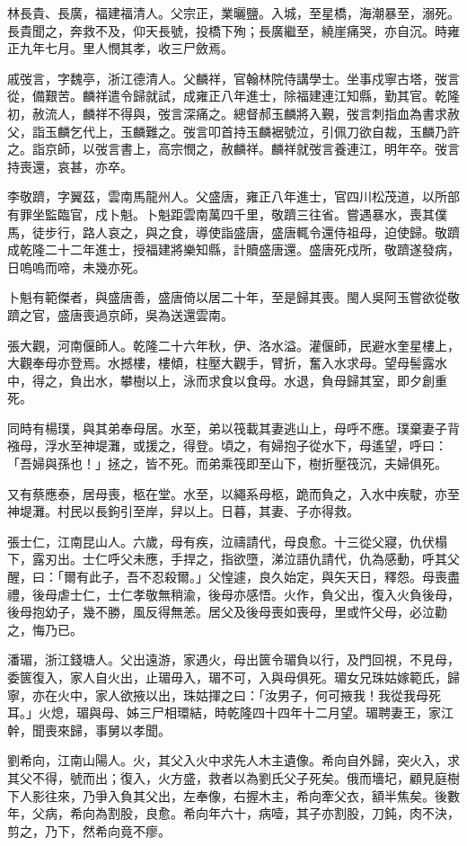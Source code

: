 \begin{pinyinscope}
林長貴、長廣，福建福清人。父宗正，業曬鹽。入城，至星橋，海潮暴至，溺死。長貴聞之，奔救不及，仰天長號，投橋下殉；長廣繼至，繞崖痛哭，亦自沉。時雍正九年七月。里人憫其孝，收三尸斂焉。

戚弢言，字魏亭，浙江德清人。父麟祥，官翰林院侍講學士。坐事戍寧古塔，弢言從，備艱苦。麟祥遣令歸就試，成雍正八年進士，除福建連江知縣，勤其官。乾隆初，赦流人，麟祥不得與，弢言深痛之。總督郝玉麟將入覲，弢言刺指血為書求赦父，詣玉麟乞代上，玉麟難之。弢言叩首持玉麟裾號泣，引佩刀欲自裁，玉麟乃許之。詣京師，以弢言書上，高宗憫之，赦麟祥。麟祥就弢言養連江，明年卒。弢言持喪還，哀甚，亦卒。

李敬躋，字翼茲，雲南馬龍州人。父盛唐，雍正八年進士，官四川松茂道，以所部有罪坐監臨官，戍卜魁。卜魁距雲南萬四千里，敬躋三往省。嘗遇暴水，喪其僕馬，徒步行，路人哀之，與之食，導使詣盛唐，盛唐輒令還侍祖母，迫使歸。敬躋成乾隆二十二年進士，授福建將樂知縣，計贖盛唐還。盛唐死戍所，敬躋遂發病，日嗚嗚而啼，未幾亦死。

卜魁有範傑者，與盛唐善，盛唐倚以居二十年，至是歸其喪。閩人吳阿玉嘗欲從敬躋之官，盛唐喪過京師，吳為送還雲南。

張大觀，河南偃師人。乾隆二十六年秋，伊、洛水溢。灌偃師，民避水奎星樓上，大觀奉母亦登焉。水撼樓，樓傾，柱壓大觀手，臂折，奮入水求母。望母髻露水中，得之，負出水，攀樹以上，泳而求食以食母。水退，負母歸其室，即夕創重死。

同時有楊璞，與其弟奉母居。水至，弟以筏載其妻逃山上，母呼不應。璞棄妻子背襁母，浮水至神堤灘，或援之，得登。頃之，有婦抱子從水下，母遙望，呼曰：「吾婦與孫也！」拯之，皆不死。而弟乘筏即至山下，樹折壓筏沉，夫婦俱死。

又有蔡應泰，居母喪，柩在堂。水至，以繩系母柩，跪而負之，入水中疾駛，亦至神堤灘。村民以長鉤引至岸，舁以上。日暮，其妻、子亦得救。

張士仁，江南昆山人。六歲，母有疾，泣禱請代，母良愈。十三從父寢，仇伏榻下，露刃出。士仁呼父未應，手捍之，指欲墮，涕泣語仇請代，仇為感動，呼其父醒，曰：「爾有此子，吾不忍殺爾。」父惶遽，良久始定，與矢天日，釋怨。母喪盡禮，後母虐士仁，士仁孝敬無稍渝，後母亦感悟。火作，負父出，復入火負後母，後母抱幼子，幾不勝，風反得無恙。居父及後母喪如喪母，里或忤父母，必泣勸之，悔乃已。

潘瑂，浙江錢塘人。父出遠游，家遇火，母出篋令瑂負以行，及門回視，不見母，委篋復入，家人自火出，止瑂毋入，瑂不可，入與母俱死。瑂女兄珠姑嫁範氏，歸寧，亦在火中，家人欲掖以出，珠姑揮之曰：「汝男子，何可掖我！我從我母死耳。」火熄，瑂與母、姊三尸相環結，時乾隆四十四年十二月望。瑂聘妻王，家江幹，聞喪來歸，事舅以孝聞。

劉希向，江南山陽人。火，其父入火中求先人木主遺像。希向自外歸，突火入，求其父不得，號而出；復入，火方盛，救者以為劉氏父子死矣。俄而墻圮，顧見庭樹下人影往來，乃爭入負其父出，左奉像，右握木主，希向牽父衣，額半焦矣。後數年，父病，希向為割股，良愈。希向年六十，病噎，其子亦割股，刀鈍，肉不決，剪之，乃下，然希向竟不瘳。


\end{pinyinscope}
